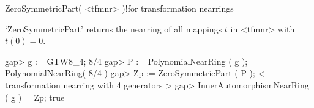 

\>ZeroSymmetricPart( <tfmnr> )!{for transformation nearrings}

`ZeroSymmetricPart' returns the nearring of all mappings $t$ in
        <tfmnr> with $t(0) = 0$.

\beginexample
    gap> g := GTW8_4;
    8/4
    gap> P := PolynomialNearRing ( g );
    PolynomialNearRing( 8/4 )
    gap> Zp := ZeroSymmetricPart ( P );
    < transformation nearring with 4 generators >
    gap> InnerAutomorphismNearRing ( g ) = Zp;
    true
\endexample









